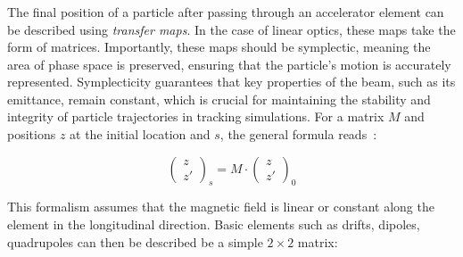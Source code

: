 \subsubsection{}
\label{section:coordinate_systems:linear_maps}

The final position of a particle after passing through an accelerator element can be described using
\textit{transfer maps}. In the case of linear optics, these maps take the form of matrices.
Importantly, these maps should be symplectic, meaning the area of phase space is preserved,
ensuring that the particle's motion is accurately represented. Symplecticity guarantees that key
properties of the beam, such as its emittance, remain constant, which is crucial for maintaining
the stability and integrity of particle trajectories in tracking simulations.
For a matrix $M$ and positions $z$ at the initial location and $s$, the general formula
reads~\cite{lee_accelerator_2004}:

\begin{equation}
    \begin{pmatrix}
        z \\
        z'
    \end{pmatrix}_s
    = M \cdot 
    \begin{pmatrix}
        z \\
        z'
    \end{pmatrix}_0
\end{equation}

This formalism assumes that the magnetic field is linear or constant along the element in the
longitudinal direction. Basic elements such as drifts, dipoles, quadrupoles can then be described be
a simple $2 \times 2$ matrix:

